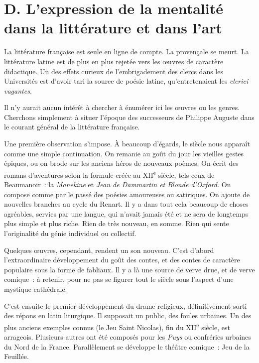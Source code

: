 \documentclass[french,twoside]{book} %
\begin{document}
\section[{D. L’expression de la mentalité dans la littérature et dans l’art}]{D. L’expression de la mentalité dans la littérature et dans l’art}
\label{c11d}
\noindent La littérature française est seule en ligne de compte. La provençale se meurt. La littérature latine est de plus en plus rejetée vers les œuvres de caractère didactique. Un des effets curieux de l’embrigadement des clercs dans les Universités est d’avoir tari la source de poésie latine, qu’entretenaient les {\itshape clerici vagantes.}\par
Il n’y aurait aucun intérêt à chercher à énumérer ici les œuvres ou les genres. Cherchons simplement à situer l’époque des successeurs de Philippe Auguste dans le courant général de la littérature française.\par
Une première observation s’impose. À beaucoup d’égards, le siècle nous apparaît comme une simple continuation. On remanie au goût du jour les vieilles gestes épiques, ou on brode sur les anciens héros de nouveaux poèmes. On écrit des romans d’aventures selon la formule créée au XII\textsuperscript{e} siècle, tels ceux de Beaumanoir : la {\itshape Manekine} et {\itshape Jean de Dammartin et Blonde d’Oxford.} On compose comme par le passé des poésies amoureuses ou satiriques. On ajoute de nouvelles branches au cycle du Renart. Il y a dans tout cela beaucoup de choses agréables, servies par une langue, qui n’avait jamais été et ne sera de longtemps plus simple et plus riche. Rien de très nouveau, en somme. Rien qui sente l’originalité du génie individuel ou collectif.\par
Quelques œuvres, cependant, rendent un son nouveau. C’est d’abord l’extraordinaire développement du goût des contes, et des contes de caractère populaire sous la forme de fabliaux. Il y a là une source de verve drue, et de verve comique : à retenir, pour ne pas se figurer tout le siècle sous l’aspect d’une mystique cathédrale.\par
C’est ensuite le premier développement du drame religieux, définitivement sorti des répons en latin liturgique. Il supposait un public, des foules urbaines. Un des plus anciens exemples connus (le Jeu Saint Nicolas), fin du XII\textsuperscript{e} siècle, est arrageois. Plusieurs autres ont été composés pour les \emph{Puys} ou confréries urbaines du Nord de la France. Parallèlement se développe le théâtre comique : Jeu de la Feuillée.\par
\end{document}
